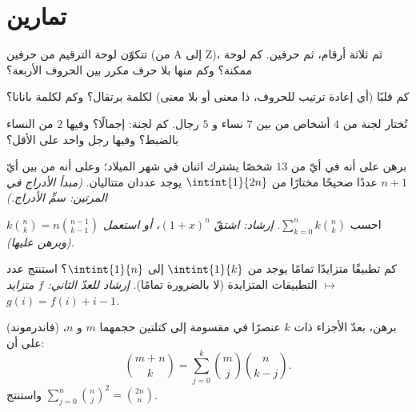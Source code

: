 \section{تمارين}

\begin{exercise}[$\star$]\label{exo:b1:counting:1}
تتكوّن لوحة الترقيم من حرفين (من A إلى Z)، ثم ثلاثة أرقام، ثم
حرفين. كم لوحة ممكنة؟ وكم منها بلا حرف مكرر بين الحروف الأربعة؟
\end{exercise}

\begin{exercise}[$\star$]\label{exo:b1:counting:2}
كم قلبًا (أي إعادة ترتيب للحروف، ذا معنى أو بلا معنى)
لكلمة \textsc{برتقال}؟ وكم لكلمة \textsc{بانانا}؟
\end{exercise}

\begin{exercise}[$\star$]\label{exo:b1:counting:3}
تُختار لجنة من $4$ أشخاص من بين $7$ نساء و $5$ رجال. كم لجنة:
إجمالًا؟ وفيها $2$ من النساء بالضبط؟ وفيها رجل واحد على الأقل؟
\end{exercise}

\begin{exercise}[$\star$]\label{exo:b1:counting:4}
برهن على أنه في أيّ  من $13$ شخصًا يشترك اثنان في شهر
الميلاد؛ وعلى أنه من بين أيّ $n + 1$ عددًا صحيحًا مختارًا من
$\intint{1}{2n}$ يوجد عددان متتاليان. \emph{(مبدأ الأدراج في
المرتين: سمِّ الأدراج.)}
\end{exercise}

\begin{exercise}[$\star$]\label{exo:b1:counting:5}
احسب $\sum_{k=0}^{n} k \binom{n}{k}$. \emph{إرشاد: اشتقّ
$(1 + x)^n$، أو استعمل $k \binom nk = n \binom{n-1}{k-1}$ (وبرهن عليها).}
\end{exercise}

\begin{exercise}[$\star\star$]\label{exo:b1:counting:6}
كم تطبيقًا متزايدًا تمامًا يوجد من $\intint{1}{k}$ إلى $\intint{1}{n}$؟ استنتج عدد التطبيقات المتزايدة (لا
بالضرورة تمامًا). \emph{إرشاد للعدّ الثاني:  $f$ متزايد
$\mapsto$ $g(i) = f(i) + i - 1$.}
\end{exercise}

\begin{exercise}[$\star\star$]\label{exo:b1:counting:7}
(فاندرموند) برهن، بعدّ الأجزاء ذات $k$ عنصرًا في  مقسومة
إلى كتلتين حجمهما $m$ و $n$، على أن:
\[
\binom{m+n}{k} = \sum_{j=0}^{k} \binom{m}{j} \binom{n}{k-j} .
\]
واستنتج $\sum_{j=0}^{n} \binom nj^2 = \binom{2n}{n}$.
\end{exercise}

